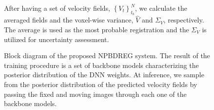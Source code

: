 \documentclass[preprint,authoryear]{elsarticle}
\begin{document}
\begin{figure}[t]
{{
        }   }	
	\caption{Block diagram of the proposed NPBDREG system. The result of the training procedure is a set of backbone models characterizing the posterior distribution of the DNN weights. At inference, we sample from the posterior distribution of the predicted velocity fields by passing the fixed and moving images through each one of the backbone models.} After having a set of velocity fields, $\left\{ V_{t}\right\} _{t_{b}}^{N}$, we calculate the averaged fields and the voxel-wise variance, $\hat{V}$ and $\Sigma_{V}$, respectively. The average is used as the most probable registration and the $\Sigma_{V}$ is utilized for uncertainty assessment. 
	\label{fig:bddiagram}
\end{figure}
\end{document}
